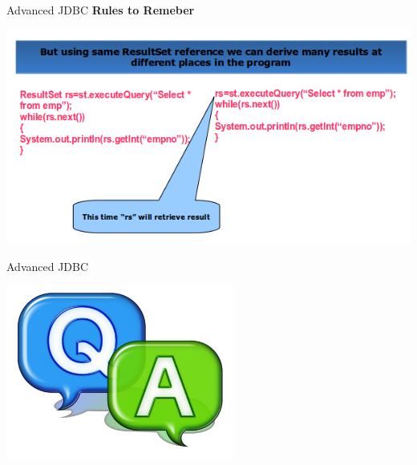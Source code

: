 \documentclass[14pt]{beamer}
\begin{document}
\begin{frame}{Advanced JDBC}
\textbf{Rules to Remeber}
\begin{center}
    \includegraphics[scale=0.5]{JEE-M03-S02-Image6.png}
  \end{center}

\end{frame}

\begin{frame}{Advanced JDBC}
\begin{center}
    \includegraphics[scale=0.5]{QA.png}
  \end{center}

\end{frame}
\end{document}
